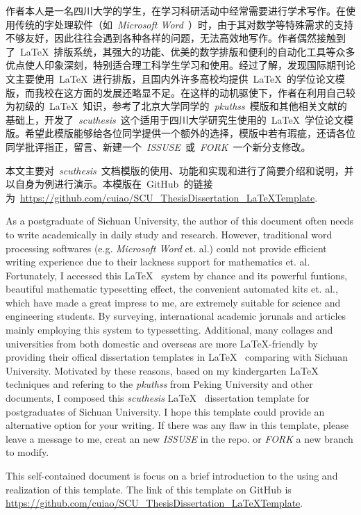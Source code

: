 \begin{CHSabstract}
	作者本人是一名四川大学的学生，在学习科研活动中经常需要进行学术写作。在使用传统的字处理软件（如~\emph{Microsoft\textsuperscript{\textregistered} Word}~）时，由于其对数学等特殊需求的支持不够友好，因此往往会遇到各种各样的问题，无法高效地写作。作者偶然接触到了~\LaTeX~排版系统，其强大的功能、优美的数学排版和便利的自动化工具等众多优点使人印象深刻，特别适合理工科学生学习和使用。经过了解，发现国际期刊论文主要使用~\LaTeX~进行排版，且国内外许多高校均提供~\LaTeX~的学位论文模版，而我校在这方面的发展还略显不足。在这样的动机驱使下，作者在利用自己较为初级的~\LaTeX~知识，参考了北京大学同学的~\emph{pkuthss}~模版和其他相关文献的基础上，开发了~\emph{scuthesis}~这个适用于四川大学研究生使用的~\LaTeX~学位论文模版。希望此模版能够给各位同学提供一个额外的选择，模版中若有瑕疵，还请各位同学批评指正，留言、新建一个~\emph{ISSUSE}~或~\emph{FORK}~一个新分支修改。


	本文主要对~\emph{scuthesis}~文档模版的使用、功能和实现和进行了简要介绍和说明，并以自身为例进行演示。本模版在~GitHub~的链接为~\url{https://github.com/cuiao/SCU_ThesisDissertation_LaTeXTemplate}.
\end{CHSabstract}

\begin{ENGabstract}
	As a postgraduate of Sichuan University, the author of this document often needs to write academically in daily study and research. However, traditional word processing softwares (e.g. \emph{Microsoft\textsuperscript{\textregistered} Word} et. al.) could not provide efficient writing experience due to their lackness support for mathematics et. al. Fortunately, I accessed this \LaTeX~ system by chance and its powerful funtions, beautiful mathematic typesetting effect, the convenient automated kits et. al., which have made a great impress to me, are extremely suitable for science and engineering students. By surveying, international academic jorunals and articles mainly employing this system to typessetting. Additional, many collages and universities from both domestic and overseas are more \LaTeX-friendly by providing their offical dissertation templates in \LaTeX~ comparing with Sichuan University. Motivated by these reasons, based on my kindergarten \LaTeX~ techniques and refering to the \emph{pkuthss} from Peking University and other documents, I composed this \emph{scuthesis} \LaTeX~ dissertation template for postgraduates of Sichuan University. I hope this template could provide an alternative option for your writing. If there was any flaw in this template, please leave a message to me, creat an new \emph{ISSUSE} in the repo. or \emph{FORK} a new branch to modify.


	This self-contained document is focus on a brief introduction to the using and realization of this template. The link of this template on GitHub is \url{https://github.com/cuiao/SCU_ThesisDissertation_LaTeXTemplate}.
\end{ENGabstract}
